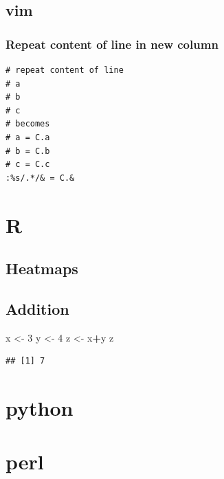 \documentclass[openany]{book}
\newenvironment{Shaded}{\begin{snugshade}}{\end{snugshade}}
\newcommand{\DecValTok}[1]{\textcolor[rgb]{0.00,0.00,0.81}{#1}}
\newcommand{\NormalTok}[1]{#1}
\newcommand{\OperatorTok}[1]{\textcolor[rgb]{0.81,0.36,0.00}{\textbf{#1}}}
\newcommand{\StringTok}[1]{\textcolor[rgb]{0.31,0.60,0.02}{#1}}
\begin{document}
\hypertarget{vim}{%
\subsection{vim}\label{vim}}

\hypertarget{repeat-content-of-line-in-new-column}{%
\subsubsection{Repeat content of line in new column}\label{repeat-content-of-line-in-new-column}}

\begin{verbatim}
# repeat content of line
# a
# b
# c
# becomes
# a = C.a
# b = C.b
# c = C.c
:%s/.*/& = C.&
\end{verbatim}

\hypertarget{r-1}{%
\section{R}\label{r-1}}

\hypertarget{heatmaps}{%
\subsection{Heatmaps}\label{heatmaps}}

\hypertarget{addition}{%
\subsection{Addition}\label{addition}}

\begin{Shaded}
\begin{Highlighting}[]
\NormalTok{x <-}\StringTok{ }\DecValTok{3}
\NormalTok{y <-}\StringTok{ }\DecValTok{4}
\NormalTok{z <-}\StringTok{ }\NormalTok{x}\OperatorTok{+}\NormalTok{y}
\NormalTok{z}
\end{Highlighting}
\end{Shaded}

\begin{verbatim}
## [1] 7
\end{verbatim}

\hypertarget{python}{%
\section{python}\label{python}}

\hypertarget{perl}{%
\section{perl}\label{perl}}
\end{document}
